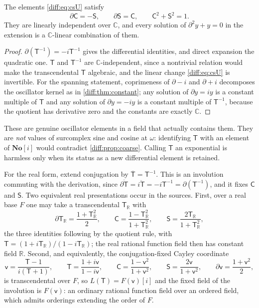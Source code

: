 \documentclass[11pt,letterpaper]{article}
\numberwithin{equation}{section}
\theoremstyle{definition}
\theoremstyle{remark}
\newcommand{\No}{\mathbf{No}}
\newcommand{\R}{\mathbb R}
\newcommand{\C}{\mathbb C}
\newcommand{\der}{\partial}
\begin{document}
\begin{proposition}
\label{diff:prop:oscillatorExtension}
The elements \cref{diff:eq:csU} satisfy
\[
 \der\mathsf C=-\mathsf S,\qquad
 \der\mathsf S=\mathsf C,\qquad
 \mathsf C^{2}+\mathsf S^{2}=1 .
\]
They are linearly independent over $\C$, and every solution of
$\der^{2}y+y=0$ in the extension is a $\C$-linear combination of them.
\end{proposition}
\begin{proof}
$\der(\mathsf T^{-1})=-i\mathsf T^{-1}$ gives the differential identities, and direct
expansion the quadratic one. $\mathsf T$ and $\mathsf T^{-1}$ are $\C$-independent, since a
nontrivial relation would make the transcendental $\mathsf T$ algebraic, and the linear
change \cref{diff:eq:csU} is invertible. For the spanning statement,
coprimeness of $\der-i$ and $\der+i$ decomposes the oscillator kernel as in
\cref{diff:thm:constant}; any solution of $\der y=iy$ is a constant multiple of
$\mathsf T$ and any solution of $\der y=-iy$ is a constant multiple of $\mathsf T^{-1}$,
because the quotient has derivative zero and the constants are exactly $\C$.
\end{proof}

These are genuine oscillator elements in a field that actually contains them.
They are \emph{not} values of surcomplex sine and cosine at $\omega$:
identifying $\mathsf T$ with an element of $\No[i]$ would contradict
\cref{diff:prop:coarse}. Calling $\mathsf T$ an exponential is harmless only when its
status as a new differential element is retained.

For the real form, extend conjugation by
$\overline{\mathsf T}=\mathsf T^{-1}$. This is an involution
commuting with the derivation, since
$\overline{\der\mathsf T}=\overline{i\mathsf T}
=-i\mathsf T^{-1}=\der(\mathsf T^{-1})$, and it fixes
$\mathsf C$ and $\mathsf S$. Two equivalent real presentations occur in the
sources. First, over a real base $F$ one may take a transcendental $\mathsf T_{\R}$
with
\begin{equation}\label{diff:eq:realT}
 \der \mathsf T_{\R}=\frac{1+\mathsf T_{\R}^{2}}{2},
 \qquad
 \mathsf C=\frac{1-\mathsf T_{\R}^{2}}{1+\mathsf T_{\R}^{2}},
 \qquad
 \mathsf S=\frac{2\mathsf T_{\R}}{1+\mathsf T_{\R}^{2}},
\end{equation}
the three identities following by the quotient rule, with
$\mathsf T=(1+i\mathsf T_{\R})/(1-i\mathsf T_{\R})$; the real rational function field then has
constant field $\R$. Second, and equivalently, the conjugation-fixed Cayley
coordinate
\begin{equation}\label{diff:eq:cayley}
 \mathsf v=\frac{\mathsf T-1}{i(\mathsf T+1)},
 \qquad
 \mathsf T=\frac{1+i\mathsf v}{1-i\mathsf v},
 \qquad
 \mathsf C=\frac{1-\mathsf v^{2}}{1+\mathsf v^{2}},
 \qquad
 \mathsf S=\frac{2\mathsf v}{1+\mathsf v^{2}},
 \qquad
 \der\mathsf v=\frac{1+\mathsf v^{2}}{2},
\end{equation}
is transcendental over $F$, so $L(\mathsf T)=F(\mathsf v)[i]$ and the fixed field of the
involution is $F(\mathsf v)$: an ordinary rational function field over an ordered
field, which admits orderings extending the order of $F$.
\end{document}
